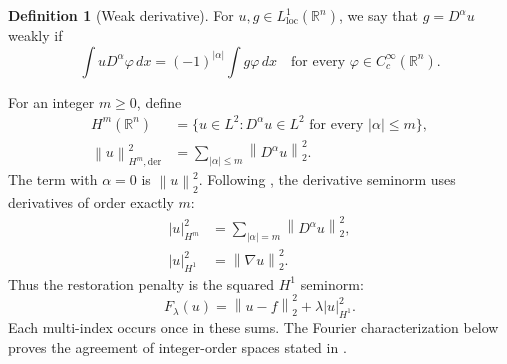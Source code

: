 \documentclass[11pt]{article}
\numberwithin{equation}{section}
\theoremstyle{definition}
\newtheorem{definition}[theorem]{Definition}
\theoremstyle{remark}
\newcommand{\R}{\mathbb R}
\newcommand{\dd}{\,d}
\newcommand{\norm}[1]{\left\|#1\right\|}
\begin{document}
\begin{definition}[Weak derivative]
For \(u,g\in L^1_{\mathrm{loc}}(\R^n)\), we say that \(g=D^\alpha u\) weakly if
\begin{equation}\label{eq:weakderivative}
 \int u D^\alpha\varphi\dd x
       =(-1)^{|\alpha|}\int g\varphi\dd x
 \quad\text{for every }\varphi\in C_c^\infty(\R^n).
\end{equation}
\end{definition}
For an integer \(m\ge0\), define
\begin{align*}
 H^m(\R^n)&=\{u\in L^2:D^\alpha u\in L^2
                       \text{ for every }|\alpha|\le m\},\\
 \norm{u}_{H^m,\mathrm{der}}^2
      &=\sum_{|\alpha|\le m}\norm{D^\alpha u}_2^2.
\end{align*}
The term with \(\alpha=0\) is \(\norm u_2^2\). Following \cite[p.~1]{vese-sobolev}, the derivative seminorm uses derivatives of order exactly \(m\):
\begin{align*}
 |u|_{H^m}^2&=\sum_{|\alpha|=m}\norm{D^\alpha u}_2^2,\\
 |u|_{H^1}^2&=\norm{\nabla u}_2^2.
\end{align*}
Thus the restoration penalty is the squared \(H^1\) seminorm:
\[
 F_\lambda(u)=\norm{u-f}_2^2+\lambda|u|_{H^1}^2.
\]
Each multi-index occurs once in these sums. The Fourier characterization below proves the agreement of integer-order spaces stated in \cite[p.~2]{vese-sobolev}.
\end{document}
